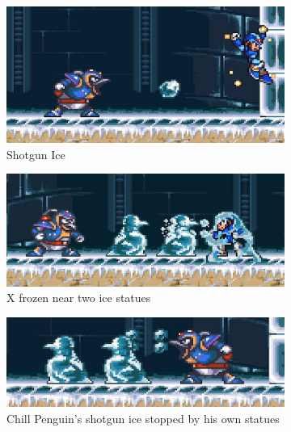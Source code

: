 \begin{figure}[htp]
	\centering
	\begin{subfigure}{0.44\textwidth}
		\centering
		\includegraphics[width=\linewidth]{figures/X1/Chill_penguin/Chill_shot.jpg}
		\caption{Shotgun Ice}
	\end{subfigure}
	\begin{subfigure}{0.53\textwidth}
		\centering
		\includegraphics[width=\linewidth]{figures/X1/Chill_penguin/Chill_frozen.jpg}
		\caption{X frozen near two ice statues}
	\end{subfigure}
	\begin{subfigure}{0.5\textwidth}
		\centering
		\includegraphics[width=\linewidth]{figures/X1/Chill_penguin/Chill_shatter.jpg}
		\caption{Chill Penguin's shotgun ice stopped by his own statues}
	\end{subfigure}
	\begin{subfigure}{0.4\textwidth}
		\centering

\end{subfigure}
\end{figure}
